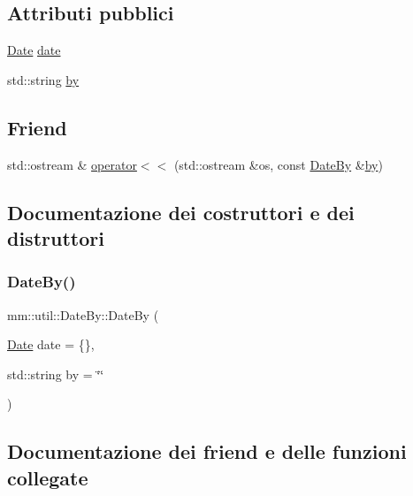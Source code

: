 \subsection*{Attributi pubblici}
\begin{DoxyCompactItemize}
\item 
\hyperlink{structmm_1_1util_1_1_date}{Date} \hyperlink{structmm_1_1util_1_1_date_by_a4adb77c6560794be119e39b374498b68}{date}
\item 
std\+::string \hyperlink{structmm_1_1util_1_1_date_by_ae431f5029222a6ec9293c4c4564834f3}{by}
\end{DoxyCompactItemize}
\subsection*{Friend}
\begin{DoxyCompactItemize}
\item 
std\+::ostream \& \hyperlink{structmm_1_1util_1_1_date_by_aee4b77cd66c6fc86b3346dcb9fc9992a}{operator$<$$<$} (std\+::ostream \&os, const \hyperlink{structmm_1_1util_1_1_date_by}{Date\+By} \&\hyperlink{structmm_1_1util_1_1_date_by_ae431f5029222a6ec9293c4c4564834f3}{by})
\end{DoxyCompactItemize}


\subsection{Documentazione dei costruttori e dei distruttori}
\mbox{\label{structmm_1_1util_1_1_date_by_a2e30c048476714b88489a1a90a1f976c}} 
\subsubsection{\texorpdfstring{Date\+By()}{DateBy()}}
{\footnotesize\ttfamily mm\+::util\+::\+Date\+By\+::\+Date\+By (\begin{DoxyParamCaption}\item[{\hyperlink{structmm_1_1util_1_1_date}{Date}}]{date = {\ttfamily \{\}},  }\item[{std\+::string}]{by = {\ttfamily \char`\"{}\char`\"{}} }\end{DoxyParamCaption})}



\subsection{Documentazione dei friend e delle funzioni collegate}
\mbox{\label{structmm_1_1util_1_1_date_by_aee4b77cd66c6fc86b3346dcb9fc9992a}} 
